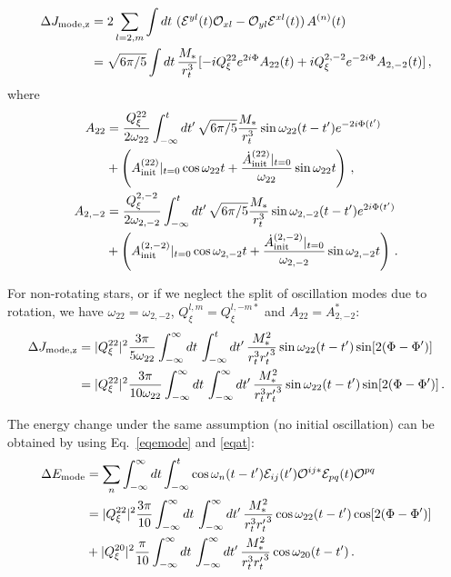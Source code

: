 \documentclass[prd,aps,floatfix,superscriptaddress,nofootinbib,twocolumn,10pt,English]{revtex4}
\begin{document}
 \begin{widetext}
  \begin{align}
\Delta J_{\rm mode, z} &= 2\sum_{l=2,m} \int dt\, \,( \mathcal{E}^{y l}(t) \mathcal{O}_{x l}-\mathcal{O}_{y l} \mathcal{E}^{x l}(t))\, A^{(n)}(t) \nonumber \\
& =  \sqrt{6 \pi/5} \int dt\, \frac{M_*}{r_t^3} [- i  Q^{22}_\xi e^{ 2 i \Phi}  A_{22}(t)+i Q^{2,-2}_\xi e^{ -2 i \Phi} A_{2,-2}(t)]\,, 
\end{align}
where
\begin{align}\label{eqamap}
A_{22} & =\frac{Q^{22}_\xi}{2\omega_{22}}\int^t_{-\infty} dt'\, \sqrt{6 \pi/5} \frac{M_*}{r_t^3} \sin \omega_{22} (t-t') e^{-2 i \Phi(t')}\nonumber \\
&+\left (A^{(22)}_{\rm init}|_{t=0} \cos{\omega_{22} t} +\frac{\dot{A}^{(22)}_{\rm init}|_{t=0} }{\omega_{22}} \sin{\omega_{22} t}\right )\,,\nonumber \\
A_{2,-2} & =\frac{Q^{2,-2}_\xi}{2\omega_{2,-2}}\int^t_{-\infty} dt'\, \sqrt{6 \pi/5} \frac{M_*}{r_t^3} \sin \omega_{2,-2} (t-t') e^{2 i \Phi(t')} \nonumber \\
&+\left (A^{(2,-2)}_{\rm init}|_{t=0} \cos{\omega_{2,-2} t} +\frac{\dot{A}^{(2,-2)}_{\rm init}|_{t=0} }{\omega_{2,-2}} \sin{\omega_{2,-2} t}\right )\,.
\end{align}
 

For non-rotating stars, or if we neglect the split of oscillation
modes due to rotation, we have $\omega_{22}=\omega_{2,-2}$,
$Q^{l,m}_\xi=Q^{l,-m*}_\xi$ and $A_{22}=A^*_{2,-2}$:
\begin{align}\label{eqdjhyper}
\Delta J_{\rm mode, z} &=  |Q^{22}_\xi|^2\frac{3 \pi}{5 \omega_{22}} \int^\infty_{-\infty} dt\,\int^t_{-\infty} dt'\, \frac{M^2_*}{r_t^3 {r_t'}^3} \sin \omega_{22}(t-t') \sin [2(\Phi-\Phi')]\,\nonumber \\
& =  |Q^{22}_\xi|^2 \frac{3 \pi}{10 \omega_{22}} \int^\infty_{-\infty} dt\,\int^\infty_{-\infty} dt'\, \frac{M^2_*}{r_t^3 {r_t'}^3} \sin \omega_{22}(t-t') \sin [2(\Phi-\Phi')]\,.
\end{align} 

The energy change under the same assumption (no initial oscillation) can be obtained by using Eq.~\eqref{eqemode} and \eqref{eqat}:
\begin{align}\label{eqehyper}
\Delta E_{\rm mode} &=\sum_n \int^\infty_{-\infty} dt \int^t_{-\infty} \cos \omega_{n}(t-t') \mathcal{E}_{ij}(t') \mathcal{O}^{ij*} \mathcal{E}_{pq}(t) \mathcal{O}^{pq} \nonumber \\
& =  |Q^{22}_\xi|^2 \frac{3 \pi}{10} \int^\infty_{-\infty} dt\,\int^\infty_{-\infty} dt'\, \frac{M^2_*}{r_t^3 {r_t'}^3} \cos \omega_{22}(t-t') \cos [2(\Phi-\Phi')] \nonumber\\
&+|Q^{20}_\xi|^2 \frac{ \pi}{10} \int^\infty_{-\infty} dt\,\int^\infty_{-\infty} dt'\, \frac{M^2_*}{r_t^3 {r_t'}^3} \cos \omega_{20}(t-t') \,.
\end{align}


\end{widetext}
 
\end{document}
